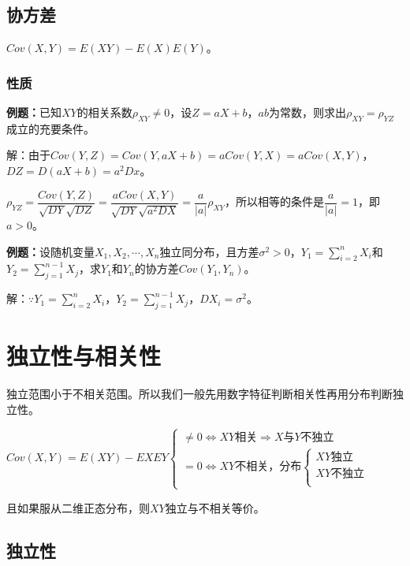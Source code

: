 \subsection{协方差}

$Cov(X,Y)=E(XY)-E(X)E(Y)$。

\subsubsection{性质}

\textbf{例题：}已知$XY$的相关系数$\rho_{XY}\neq0$，设$Z=aX+b$，$ab$为常数，则求出$\rho_{XY}=\rho_{YZ}$成立的充要条件。

解：由于$Cov(Y,Z)=Cov(Y,aX+b)=aCov(Y,X)=aCov(X,Y)$，$DZ=D(aX+b)=a^2Dx$。

$\rho_{YZ}=\dfrac{Cov(Y,Z)}{\sqrt{DY}\sqrt{DZ}}=\dfrac{aCov(X,Y)}{\sqrt{DY}\sqrt{a^2DX}}=\dfrac{a}{\vert a\vert}\rho_{XY}$，所以相等的条件是$\dfrac{a}{\vert a\vert}=1$，即$a>0$。

\textbf{例题：}设随机变量$X_1,X_2,\cdots,X_n$独立同分布，且方差$\sigma^2>0$，$Y_1=\sum\limits_{i=2}^nX_i$和$Y_2=\sum\limits_{j=1}^{n-1}X_j$，求$Y_1$和$Y_n$的协方差$Cov(Y_1,Y_n)$。

解：$\because Y_1=\sum\limits_{i=2}^nX_i$，$Y_2=\sum\limits_{j=1}^{n-1}X_j$，$DX_i=\sigma^2$。

\section{独立性与相关性}

独立范围小于不相关范围。所以我们一般先用数字特征判断相关性再用分布判断独立性。

$Cov(X,Y)=E(XY)-EXEY\left\{\begin{array}{l}
    \neq0\Leftrightarrow XY\text{相关}\Rightarrow X\text{与}Y\text{不独立} \\
    =0\Leftrightarrow XY\text{不相关，分布}\left\{\begin{array}{l}
        XY\text{独立} \\
        XY\text{不独立} \\
    \end{array}\right.
\end{array}\right.$

且如果服从二维正态分布，则$XY$独立与不相关等价。

\subsection{独立性}

